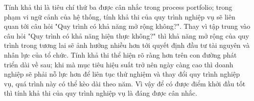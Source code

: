 Tính khả thi là tiêu chí thứ ba được cân nhắc trong process portfolio; trong phạm vi ngữ cảnh của hệ thống, tính khả thi của quy trình nghiệp vụ sẽ liên quan tới câu hỏi "Quy trình có khả năng mở rộng không?". Thay vì tập trung vào câu hỏi "Quy trình có khả năng hiện thực không?" thì khả năng mở rộng của quy trình trong tương lai sẽ ảnh hưởng nhiều hơn tới quyết định đầu tư tài nguyên và nhân lực của tổ chức. Tính khả thi thể hiện rõ ràng hơn trên con đường phát triển dài về sau; khi mà mục tiêu hiệu suất trở nên ngày càng cao thì doanh nghiệp sẽ phải nỗ lực hơn để liên tục thử nghiệm và thay đổi quy trình nghiệp vụ, quá trình này có thể kèo dài theo năm. Vì vậy để có được điểm khởi đầu tốt thì tính khả thi của quy trình nghiệp vụ là đáng được cân nhắc.